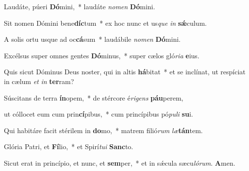 \item Laudáte, púeri \textbf{Dó}mini,~* laudáte \textit{no}\textit{men} \textbf{Dó}mini.

\item Sit nomen Dómini bene\textbf{díc}tum~* ex hoc nunc et us\textit{que} \textit{in} \textbf{sǽ}culum.

\item A solis ortu usque ad oc\textbf{cá}sum~* laudábile \textit{no}\textit{men} \textbf{Dó}mini.

\item Excélsus super omnes gentes \textbf{Dó}minus,~* super cælos gló\textit{ri}\textit{a} \textbf{e}ius.

\item Quis sicut Dóminus Deus noster, qui in altis \textbf{há}bitat~* et se inclínat, ut respíciat in cælum \textit{et} \textit{in} \textbf{ter}ram?

\item Súscitans de terra \textbf{ín}opem,~* de stércore é\textit{ri}\textit{gens} \textbf{páu}perem,

\item ut cóllocet eum cum prin\textbf{cí}pibus,~* cum princípibus pó\textit{pu}\textit{li} \textbf{su}i.

\item Qui habitáre facit stérilem in \textbf{do}mo,~* matrem filió\textit{rum} \textit{læ}\textbf{tán}tem.

\item Glória Patri, et \textbf{Fí}lio,~* et Spirí\textit{tu}\textit{i} \textbf{Sanc}to.

\item Sicut erat in princípio, et nunc, et \textbf{sem}per,~* et in sǽcula sæcu\textit{ló}\textit{rum}. \textbf{A}men.